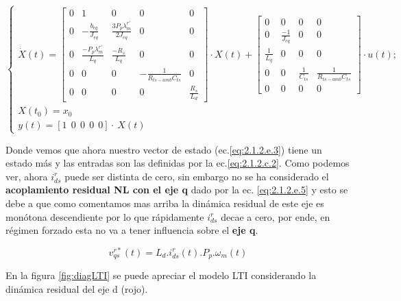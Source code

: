 \documentclass[10pt]{article}
\begin{document}
\begin{enumerate}
\begin{itemize}
	\begin{equation}
	\begin{cases}
	\dot{X}(t)=\begin{bmatrix}
	0 & 1 &0 &0&0\\ 
	0 & -\frac{b_{eq}}{J_{eq}} & \frac{3 P_{p} \lambda^{r'}_{m}}{2 J_{eq}} & 0&0\\ 
	0  & \frac{- P_{p} \lambda^{r'}_{m}}{ L_{q}} & \frac{-R_{s}}{L_{q}} & 0&0\\
	0 & 0 & 0 & -\frac{1}{R_{ts-amb} C_{ts}}&0\\
	0&0&0&0&\frac{R_{s}}{L_{d}}
	\end{bmatrix}\cdot X(t) + \begin{bmatrix}
	0 &0 &0 &0\\ 
	0 &\frac{-1}{J_{eq}} &0 &0\\ 
	 \frac{1}{L_{q}}&0 &0 & 0\\
	0 & 0 & \frac{1}{C_{ts}} & \frac{1}{R_{ts-amb} C_{ts}}\\
	0 &0 &0 &0
	\end{bmatrix} 
	\cdot u(t); \\
	X(t_{0})=x_{0}\\ 
	y(t)=[1 \ \ 0 \ \ 0 \ \ 0 \ \ 0]\cdot \ X(t)
	\end{cases}
	\label{eq:2.1.2.e.4}
	\end{equation}
	

	

	Donde vemos que ahora nuestro vector de estado (ec.\ref{eq:2.1.2.e.3}) tiene un estado más y las entradas son las definidas por la ec.\ref{eq:2.1.2.c.2}. Como podemos ver, ahora $i^{r}_{ds}$ puede ser distinta de cero, sin embargo no se ha considerado el \textbf{acoplamiento residual NL con el eje q} dado por la ec. \ref{eq:2.1.2.e.5} y esto se debe a que como comentamos mas arriba la dinámica residual de este eje es monótona descendiente por lo que rápidamente $i^{r}_{ds}$ decae a cero, por ende, en régimen forzado esta no va a tener influencia sobre el \textbf{eje q}.
	
	\begin{equation}
	v^{r*}_{qs}(t)=L_{d}. i^{r}_{ds}(t).P_{p}.\omega_{m}(t)
	\label{eq:2.1.2.e.5}
	\end{equation}
	
	En la figura \ref{fig:diagLTI} se puede apreciar el modelo LTI considerando la dinámica residual del eje d (rojo).
	

\end{itemize}
\end{enumerate}
\end{document}
